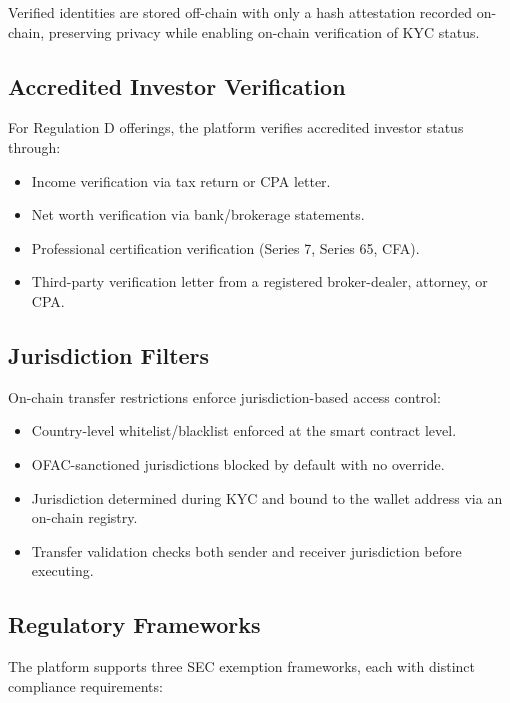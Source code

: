 \documentclass[11pt,letterpaper]{article}
\begin{document}
Verified identities are stored off-chain with only a hash attestation recorded
on-chain, preserving privacy while enabling on-chain verification of KYC
status.

\subsection{Accredited Investor Verification}

For Regulation D offerings, the platform verifies accredited investor status
through:

\begin{itemize}[leftmargin=1.2em]
    \item Income verification via tax return or CPA letter.
    \item Net worth verification via bank/brokerage statements.
    \item Professional certification verification (Series 7, Series 65, CFA).
    \item Third-party verification letter from a registered broker-dealer,
    attorney, or CPA.
\end{itemize}

\subsection{Jurisdiction Filters}

On-chain transfer restrictions enforce jurisdiction-based access control:

\begin{itemize}[leftmargin=1.2em]
    \item Country-level whitelist/blacklist enforced at the smart contract
    level.
    \item OFAC-sanctioned jurisdictions blocked by default with no override.
    \item Jurisdiction determined during KYC and bound to the wallet address
    via an on-chain registry.
    \item Transfer validation checks both sender and receiver jurisdiction
    before executing.
\end{itemize}

\subsection{Regulatory Frameworks}

The platform supports three SEC exemption frameworks, each with distinct
compliance requirements:
\end{document}
